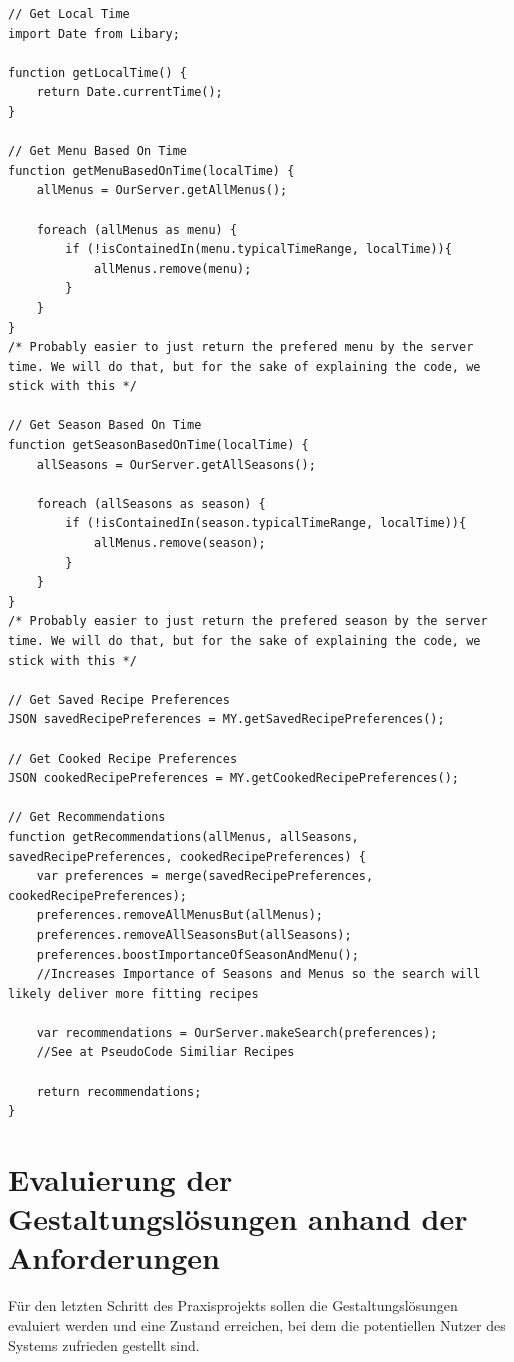 \begin{lstlisting}[caption=Pseudocode - Empfehlungen,label={lst:Recommendations}]
// Get Local Time
import Date from Libary;

function getLocalTime() {
    return Date.currentTime();
}

// Get Menu Based On Time
function getMenuBasedOnTime(localTime) {
    allMenus = OurServer.getAllMenus();

    foreach (allMenus as menu) {
        if (!isContainedIn(menu.typicalTimeRange, localTime)){
            allMenus.remove(menu);
        }
    }
} 
/* Probably easier to just return the prefered menu by the server time. We will do that, but for the sake of explaining the code, we stick with this */

// Get Season Based On Time
function getSeasonBasedOnTime(localTime) {
    allSeasons = OurServer.getAllSeasons();

    foreach (allSeasons as season) {
        if (!isContainedIn(season.typicalTimeRange, localTime)){
            allMenus.remove(season);
        }
    }
} 
/* Probably easier to just return the prefered season by the server time. We will do that, but for the sake of explaining the code, we stick with this */

// Get Saved Recipe Preferences
JSON savedRecipePreferences = MY.getSavedRecipePreferences();

// Get Cooked Recipe Preferences
JSON cookedRecipePreferences = MY.getCookedRecipePreferences();

// Get Recommendations
function getRecommendations(allMenus, allSeasons, savedRecipePreferences, cookedRecipePreferences) {
    var preferences = merge(savedRecipePreferences, cookedRecipePreferences);
    preferences.removeAllMenusBut(allMenus);
    preferences.removeAllSeasonsBut(allSeasons);
    preferences.boostImportanceOfSeasonAndMenu(); 
    //Increases Importance of Seasons and Menus so the search will likely deliver more fitting recipes

    var recommendations = OurServer.makeSearch(preferences); 
    //See at PseudoCode Similiar Recipes

    return recommendations;
}
\end{lstlisting}
\section{Evaluierung der Gestaltungslösungen anhand der Anforderungen}
Für den letzten Schritt des Praxisprojekts sollen die Gestaltungslösungen evaluiert werden und eine Zustand erreichen, bei dem die potentiellen Nutzer des Systems zufrieden gestellt sind. \\

